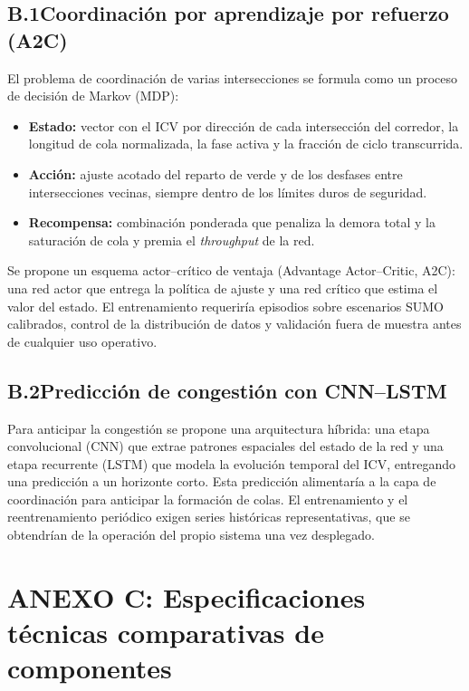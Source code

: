 \subsection*{B.1\quad Coordinación por aprendizaje por refuerzo (A2C)}
El problema de coordinación de varias intersecciones se formula como un proceso de decisión de Markov (MDP):
\begin{itemize}
\item \textbf{Estado:} vector con el ICV por dirección de cada intersección del corredor, la longitud de
cola normalizada, la fase activa y la fracción de ciclo transcurrida.
\item \textbf{Acción:} ajuste acotado del reparto de verde y de los desfases entre intersecciones vecinas,
siempre dentro de los límites duros de seguridad.
\item \textbf{Recompensa:} combinación ponderada que penaliza la demora total y la saturación de cola y
premia el \textit{throughput} de la red.
\end{itemize}
Se propone un esquema actor--crítico de ventaja (Advantage Actor--Critic, A2C): una red actor que entrega la
política de ajuste y una red crítico que estima el valor del estado. El entrenamiento requeriría episodios
sobre escenarios SUMO calibrados, control de la distribución de datos y validación fuera de muestra antes de
cualquier uso operativo.

\subsection*{B.2\quad Predicción de congestión con CNN--LSTM}
Para anticipar la congestión se propone una arquitectura híbrida: una etapa convolucional (CNN) que extrae
patrones espaciales del estado de la red y una etapa recurrente (LSTM) que modela la evolución temporal del
ICV, entregando una predicción a un horizonte corto. Esta predicción alimentaría a la capa de coordinación
para anticipar la formación de colas. El entrenamiento y el reentrenamiento periódico exigen series
históricas representativas, que se obtendrían de la operación del propio sistema una vez desplegado.

\section*{ANEXO C: Especificaciones técnicas comparativas de componentes}
\label{anexo:componentes}

